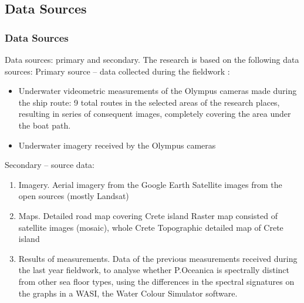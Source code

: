 \documentclass[pdflatex,compress]{beamer}
\begin{document}
\subsection{Data Sources}
\begin{frame}\frametitle{Data Sources}
\footnotesize{Data sources: primary and secondary. The research is based on the following data sources:
Primary source – data collected during the fieldwork :
\begin{itemize}
	\item Underwater videometric measurements of the Olympus cameras made during the ship route: 9 total routes in the selected areas of the research places, resulting in series of consequent images, completely covering the area under the boat path.
	\item Underwater imagery received by the Olympus cameras
\end{itemize}

Secondary – source data:
\begin{enumerate}
	\item Imagery. Aerial imagery from the Google Earth
Satellite images from the open sources (mostly Landsat)
	\item Maps. Detailed road map covering Crete island
Raster map consisted of satellite images (mosaic), whole Crete Topographic detailed map of Crete island
	\item Results of measurements. Data of the previous measurements received during the last year fieldwork, to analyse whether P.Oceanica is spectrally distinct from other sea floor types, using the differences in the spectral signatures on the graphs in a WASI, the Water Colour Simulator software.
\end{enumerate}}

\end{frame}
\end{document}
